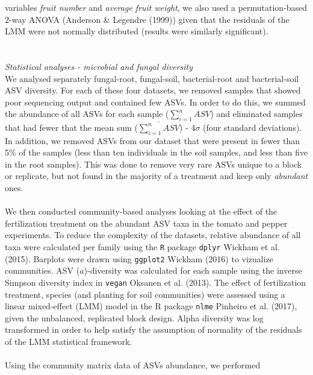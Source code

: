 \documentclass[11pt,]{article}
\begin{document}
variables \emph{fruit number} and \emph{average fruit weight}, we also
used a permutation-based 2-way ANOVA (Anderson \& Legendre (1999)) given
that the residuals of the LMM were not normally distributed (results
were similarly significant).\\
\hspace*{0.333em}\\
\hspace*{0.333em}\\
\emph{Statistical analyses - microbial and fungal diversity}\\
We analysed separately fungal-root, fungal-soil, bacterial-root and
bacterial-soil ASV diversity. For each of these four datasets, we
removed samples that showed poor sequencing output and contained few
ASVs. In order to do this, we summed the abundance of all ASVs for each
sample (\(\sum_{i=1}^n ASV\)) and eliminated samples that had fewer that
the mean sum (\(\overline{\sum_{i=1}^n ASV}\)) - 4\(\sigma\) (four
standard deviations). In addition, we removed ASVs from our dataset that
were present in fewer than 5\% of the samples (less than ten individuals
in the soil samples, and less than five in the root samples). This was
done to remove very rare ASVs unique to a block or replicate, but not
found in the majority of a treatment and keep only \emph{abundant}
ones.\\
\hspace*{0.333em}\\
We then conducted community-based analyses looking at the effect of the
fertilization treatment on the abundant ASV taxa in the tomato and
pepper experiments. To reduce the complexity of the datasets, relative
abundance of all taxa were calculated per family using the \texttt{R}
package \texttt{dplyr} Wickham et al. (2015). Barplots were drawn using
\texttt{ggplot2} Wickham (2016) to vizualize communities. ASV
(\(a\))-diversity was calculated for each sample using the inverse
Simpson diversity index in \texttt{vegan} Oksanen et al. (2013). The
effect of fertilization treatment, species (and planting for soil
communities) were assessed using a linear mixed-effect (LMM) model in
the R package \texttt{nlme} Pinheiro et al. (2017), given the
unbalanced, replicated block design. Alpha diversity was log transformed
in order to help satisfy the assumption of normality of the residuals of
the LMM statistical framework.\\
\hspace*{0.333em}\\
Using the community matrix data of ASVs abundance, we performed
\end{document}
